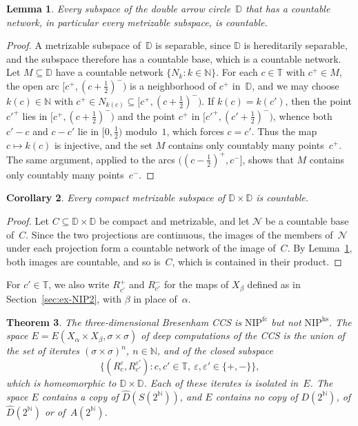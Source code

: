 \documentclass[psamsfonts]{amsart}
\newtheorem{thm}{Theorem}[section]
\newtheorem{cor}[thm]{Corollary}
\newtheorem{lem}[thm]{Lemma}
\theoremstyle{definition}
\theoremstyle{remark}
\newcommand{\NIP}{\text{NIP}}
\numberwithin{equation}{section}
\begin{document}
\begin{lem}\label{lem:double-arrow-metrizable}
Every subspace of the double arrow circle~$\mathbb{D}$ that has a countable network, in particular every metrizable subspace, is countable.
\end{lem}

\begin{proof}
A metrizable subspace of~$\mathbb{D}$ is separable, since $\mathbb{D}$ is hereditarily separable, and the subspace therefore has a countable base, which is a countable network.
Let $M\subseteq\mathbb{D}$ have a countable network $\{N_k:k\in\mathbb{N}\}$.
For each $c\in\mathbb{T}$ with $c^+\in M$, the open arc $[c^+,(c+\frac12)^-)$ is a neighborhood of $c^+$ in~$\mathbb{D}$, and we may choose $k(c)\in\mathbb{N}$ with $c^+\in N_{k(c)}\subseteq[c^+,(c+\frac12)^-)$.
If $k(c)=k(c')$, then the point $c'^+$ lies in $[c^+,(c+\frac12)^-)$ and the point $c^+$ in $[c'^+,(c'+\frac12)^-)$, whence both $c'-c$ and $c-c'$ lie in $[0,\frac12)$ modulo~$1$, which forces $c=c'$.
Thus the map $c\mapsto k(c)$ is injective, and the set $M$ contains only countably many points~$c^+$.
The same argument, applied to the arcs $((c-\frac12)^+,c^-]$, shows that $M$ contains only countably many points~$c^-$.
\end{proof}

\begin{cor}\label{cor:DxD-compact-metrizable}
Every compact metrizable subspace of $\mathbb{D}\times\mathbb{D}$ is countable.
\end{cor}

\begin{proof}
Let $C\subseteq\mathbb{D}\times\mathbb{D}$ be compact and metrizable, and let $\mathcal{N}$ be a countable base of~$C$.
Since the two projections are continuous, the images of the members of~$\mathcal{N}$ under each projection form a countable network of the image of~$C$.
By Lemma~\ref{lem:double-arrow-metrizable}, both images are countable, and so is~$C$, which is contained in their product.
\end{proof}

For $c'\in\mathbb{T}$, we also write $R_{c'}^+$ and $R_{c'}^-$ for the maps of $X_\beta$ defined as in Section~\ref{sec:ex-NIP2}, with $\beta$ in place of~$\alpha$.

\begin{thm}\label{thm:Bresenham3}
The three-dimensional Bresenham CCS is $\NIP^{\mathrm{fc}}$ but not $\NIP^{\mathrm{hs}}$.
The space $E=E(X_\alpha\times X_\beta,\sigma\times\sigma)$ of deep computations of the CCS is the union of the set of iterates $(\sigma\times\sigma)^n$, $n\in\mathbb{N}$, and of the closed subspace
\[
\{(R_c^\varepsilon,R_{c'}^{\varepsilon'}):c,c'\in\mathbb{T},\ \varepsilon,\varepsilon'\in\{+,-\}\},
\]
which is homeomorphic to $\mathbb{D}\times\mathbb{D}$.
Each of these iterates is isolated in~$E$.
The space $E$ contains a copy of $\hat D(S(2^{\mathbb{N}}))$, and $E$ contains no copy of $D(2^{\mathbb{N}})$, of $\hat D(2^{\mathbb{N}})$ or of~$A(2^{\mathbb{N}})$.
\end{thm}
\end{document}
